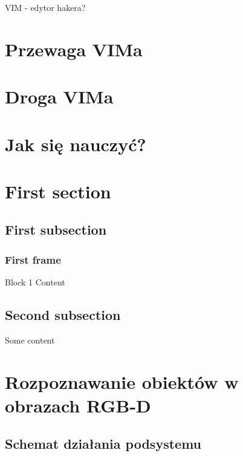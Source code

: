 \documentclass{beamer}
\begin{document}
\begin{frame}[t]{VIM - edytor hakera?}
\end{frame}

\section{Przewaga VIMa}
\label{sec:Przewaga VIMa}

\section{Droga VIMa}
\label{sec:Droga VIMa}

\section{Jak się nauczyć?}
\label{sec:Jak się nauczyć?}



\section{First section}
\subsection{First subsection}
\begin{frame}
\frametitle{First frame}
\begin{block}{Block 1}
Content
\end{block}
\end{frame}

\subsection{Second subsection}
\begin{frame}
Some content
\end{frame}

\section{Rozpoznawanie obiektów w obrazach RGB-D}

\subsection{Schemat działania podsystemu}
\end{document}
